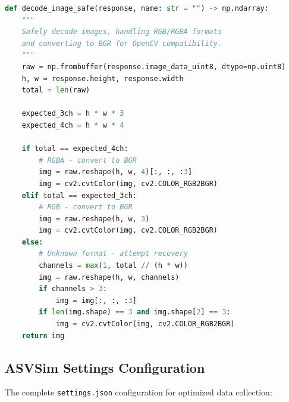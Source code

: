 \begin{lstlisting}[language=Python, caption={Image Decoding with Color Space Conversion}]
def decode_image_safe(response, name: str = "") -> np.ndarray:
    """
    Safely decode images, handling RGB/RGBA formats
    and converting to BGR for OpenCV compatibility.
    """
    raw = np.frombuffer(response.image_data_uint8, dtype=np.uint8)
    h, w = response.height, response.width
    total = len(raw)

    expected_3ch = h * w * 3
    expected_4ch = h * w * 4

    if total == expected_4ch:
        # RGBA - convert to BGR
        img = raw.reshape(h, w, 4)[:, :, :3]
        img = cv2.cvtColor(img, cv2.COLOR_RGB2BGR)
    elif total == expected_3ch:
        # RGB - convert to BGR
        img = raw.reshape(h, w, 3)
        img = cv2.cvtColor(img, cv2.COLOR_RGB2BGR)
    else:
        # Unknown format - attempt recovery
        channels = max(1, total // (h * w))
        img = raw.reshape(h, w, channels)
        if channels > 3:
            img = img[:, :, :3]
        if len(img.shape) == 3 and img.shape[2] == 3:
            img = cv2.cvtColor(img, cv2.COLOR_RGB2BGR)
    return img
\end{lstlisting}

\subsection{ASVSim Settings Configuration}

The complete \texttt{settings.json} configuration for optimized data collection:

